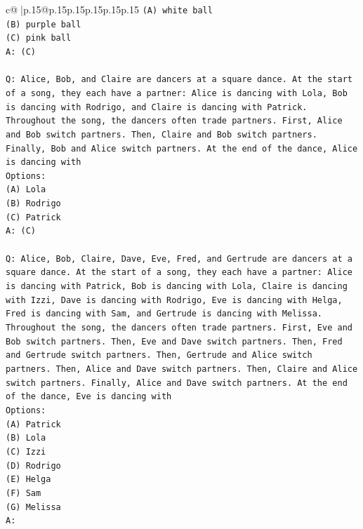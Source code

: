 \documentclass{article}
\begin{document}
{\begin{supertabular}{c@{$\;$}|p{.15\linewidth}@{}p{.15\linewidth}p{.15\linewidth}p{.15\linewidth}p{.15\linewidth}p{.15\linewidth}}
{{{\texttt{(A) white ball} \\
\texttt{(B) purple ball} \\
\texttt{(C) pink ball} \\
\texttt{A: (C)} \\
\\ 
\texttt{Q: Alice, Bob, and Claire are dancers at a square dance. At the start of a song, they each have a partner: Alice is dancing with Lola, Bob is dancing with Rodrigo, and Claire is dancing with Patrick.} \\
\texttt{Throughout the song, the dancers often trade partners. First, Alice and Bob switch partners. Then, Claire and Bob switch partners. Finally, Bob and Alice switch partners. At the end of the dance, Alice is dancing with} \\
\texttt{Options:} \\
\texttt{(A) Lola} \\
\texttt{(B) Rodrigo} \\
\texttt{(C) Patrick} \\
\texttt{A: (C)} \\
\\ 
\texttt{Q: Alice, Bob, Claire, Dave, Eve, Fred, and Gertrude are dancers at a square dance. At the start of a song, they each have a partner: Alice is dancing with Patrick, Bob is dancing with Lola, Claire is dancing with Izzi, Dave is dancing with Rodrigo, Eve is dancing with Helga, Fred is dancing with Sam, and Gertrude is dancing with Melissa.} \\
\texttt{Throughout the song, the dancers often trade partners. First, Eve and Bob switch partners. Then, Eve and Dave switch partners. Then, Fred and Gertrude switch partners. Then, Gertrude and Alice switch partners. Then, Alice and Dave switch partners. Then, Claire and Alice switch partners. Finally, Alice and Dave switch partners. At the end of the dance, Eve is dancing with} \\
\texttt{Options:} \\
\texttt{(A) Patrick} \\
\texttt{(B) Lola} \\
\texttt{(C) Izzi} \\
\texttt{(D) Rodrigo} \\
\texttt{(E) Helga} \\
\texttt{(F) Sam} \\
\texttt{(G) Melissa} \\
\texttt{A:} \\
            }
        }
    }
     \\ \\


\end{supertabular}}
\end{document}
